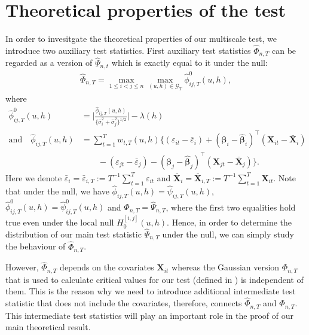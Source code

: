 \documentclass[a4paper,12pt]{article}
\makeatletter
\renewcommand{\eqref}[1]{\tagform@{\ref{#1}}}
\makeatother
\begin{document}
\section{Theoretical properties of the test}\label{sec:theo}


In order to invesitgate the theoretical properties of our multiscale test, we introduce two auxiliary test statistics. First auxiliary test statistics $\widehat{\Phi}_{n, T}$ can be regarded as a version of $\widehat{\Psi}_{n, t}$ which is exactly equal to it under the null:
\begin{align}\label{eq:Phi_hat}
\widehat{\Phi}_{n,T} = \max_{1 \le i < j \le n}  \max_{(u,h) \in \mathcal{G}_T} \widehat{\phi}^0_{ij,T}(u,h),
\end{align}
where
\begin{align}\label{eq:phi_hat_ij_zero}
\widehat{\phi}^0_{ij,T}(u,h) &=\bigg| \frac{\widehat{\phi}_{ij,T}(u,h)} {\{ \widehat{\sigma}_i^2 + \widehat{\sigma}_j^2 \}^{1/2}} \bigg| - \lambda(h)\\
\text{and} \quad \widehat{\phi}_{ij,T}(u,h) &= \sum_{t=1}^T w_{t,T}(u,h) \big\{ (\varepsilon_{it} - \bar{\varepsilon}_i) + (\bm{\beta}_i - \widehat{\bm{\beta}}_i)^\top (\mathbf{X}_{it} - \bar{\mathbf{X}}_{i}) \nonumber\\
& \quad \quad - (\varepsilon_{jt} - \bar{\varepsilon}_j) -  (\bm{\beta}_j - \widehat{\bm{\beta}}_j)^\top (\mathbf{X}_{jt} - \bar{\mathbf{X}}_{j}) \big\}.\nonumber
\end{align}
Here we denote $\bar{\varepsilon}_i = \bar{\varepsilon}_{i,T} := T^{-1} \sum_{t=1}^T \varepsilon_{it}$ and
$ \bar{\mathbf{X}}_{i} =  \bar{\mathbf{X}}_{i, T} := T^{-1}\sum_{t=1}^T  \mathbf{X}_{it}$. Note that under the null, we have $\widehat{\phi}_{ij,T}(u,h) = \widehat{\psi}_{ij,T}(u,h)$, $\widehat{\phi}^0_{ij,T}(u,h) = \widehat{\psi}^0_{ij,T}(u,h)$ and $\widehat{\Phi}_{n,T} = \widehat{\Psi}_{n,T}$, where the first two equalities hold true even under the local null $H_0^{[i, j]}(u, h)$. Hence, in order to determine the distribution of our main test statistic $\widehat{\Psi}_{n,T}$ under the null, we can simply study the behaviour of $\widehat{\Phi}_{n,T}$. 

However, $\widehat{\Phi}_{n,T}$ depends on the covariates $\mathbf{X}_{it}$ whereas the Gaussian version $\Phi_{n,T}$ that is used to calculate critical values for our test (defined in \eqref{eq:Phi}) is independent of them. This is the reason why we need to introduce additional intermediate test statistic that does not include the covariates, therefore, connects $\widehat{\Phi}_{n,T}$ and $\Phi_{n,T}$. This intermediate test statistics will play an important role in the proof of our main theoretical result.
\end{document}
